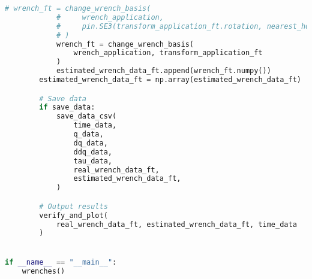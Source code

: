 \begin{lstlisting}[language=python, caption=\raggedright{verification/fs\_verification.py}, frame=single]
            # wrench_ft = change_wrench_basis(
            #     wrench_application,
            #     pin.SE3(transform_application_ft.rotation, nearest_hole),
            # )
            wrench_ft = change_wrench_basis(
                wrench_application, transform_application_ft
            )
            estimated_wrench_data_ft.append(wrench_ft.numpy())
        estimated_wrench_data_ft = np.array(estimated_wrench_data_ft)

        # Save data
        if save_data:
            save_data_csv(
                time_data,
                q_data,
                dq_data,
                ddq_data,
                tau_data,
                real_wrench_data_ft,
                estimated_wrench_data_ft,
            )

        # Output results
        verify_and_plot(
            real_wrench_data_ft, estimated_wrench_data_ft, time_data
        )


if __name__ == "__main__":
    wrenches()

\end{lstlisting}